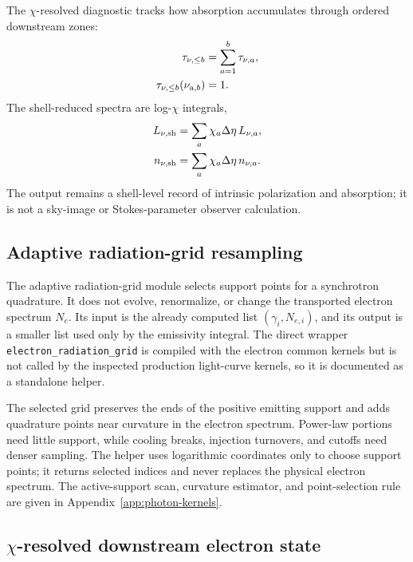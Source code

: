 \documentclass[twocolumn]{aastex702}
\begin{document}
The \(\chi\)-resolved diagnostic tracks how absorption accumulates through
ordered downstream zones:
\begin{equation}
\begin{aligned}
\tau_{\nu,\le b}&=\sum_{a=1}^b\tau_{\nu,a},\\
\tau_{\nu,\le b}(\nu_{{\rm a},b})&=1.
\end{aligned}
\end{equation}
The shell-reduced spectra are log-\(\chi\) integrals,
\begin{equation}
\begin{aligned}
L_{\nu,{\rm sh}}&=\sum_a \chi_a\Delta\eta\,L_{\nu,a},\\
n_{\nu,{\rm sh}}&=\sum_a \chi_a\Delta\eta\,n_{\nu,a}.
\end{aligned}
\end{equation}
The output remains a shell-level record of intrinsic polarization and absorption;
it is not a sky-image or Stokes-parameter observer calculation.

\subsection{Adaptive radiation-grid resampling}

The adaptive radiation-grid module selects support points for a synchrotron
quadrature.  It does not evolve, renormalize, or change the transported electron
spectrum \(N_e\).  Its input is the already computed list
\((\gamma_i,N_{e,i})\), and its output is a smaller list used only by the
emissivity integral.  The direct wrapper
\texttt{electron\_radiation\_grid} is compiled with the electron common kernels
but is not called by the inspected production light-curve kernels, so it is
documented as a standalone helper.

The selected grid preserves the ends of the positive emitting support and adds
quadrature points near curvature in the electron spectrum.  Power-law portions
need little support, while cooling breaks, injection turnovers, and cutoffs need
denser sampling.  The helper uses logarithmic coordinates only to choose support
points; it returns selected indices and never replaces the physical electron
spectrum.  The active-support scan, curvature estimator, and point-selection
rule are given in Appendix~\ref{app:photon-kernels}.

\subsection{\texorpdfstring{\(\chi\)}{chi}-resolved downstream electron state}
\end{document}
